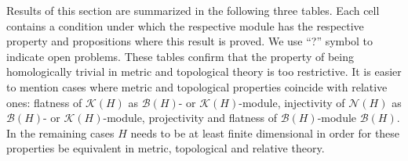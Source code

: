 Results of this section are summarized in the following three tables. Each cell
contains a condition under which the respective module has the respective
property and propositions where this result is proved. We use ``?'' symbol to indicate
open problems. These tables confirm that the property of being homologically
trivial in metric and topological theory is too restrictive. It is easier to
mention cases where metric and topological properties coincide with relative
ones: flatness of $\mathcal{K}(H)$ as $\mathcal{B}(H)$- or
$\mathcal{K}(H)$-module, injectivity of $\mathcal{N}(H)$ as $\mathcal{B}(H)$- or
$\mathcal{K}(H)$-module, projectivity and flatness of $\mathcal{B}(H)$-module
$\mathcal{B}(H)$. In the remaining cases $H$ needs to be at least finite
dimensional in order for these properties be equivalent in metric, topological
and relative theory.


